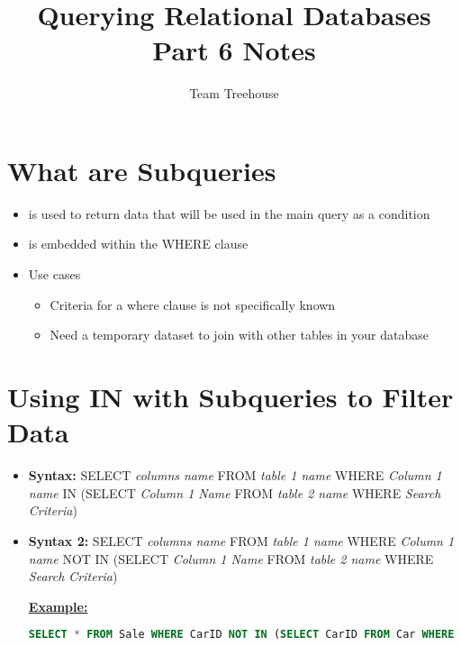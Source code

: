 \documentclass[12pt]{article}
\begin{document}
\title{Querying Relational Databases Part 6 Notes}
\author{Team Treehouse}
\maketitle

\bigskip

\section{What are Subqueries}

\bigskip

\begin{itemize}
    \item is used to return data that will be used in the main query as a condition
    \item is embedded within the WHERE clause
    \item Use cases
    \begin{itemize}
        \item Criteria for a where clause is not specifically known
        \item Need a temporary dataset to join with other tables in your database
    \end{itemize}
\end{itemize}

\bigskip

\section{Using IN with Subqueries to Filter Data}

\bigskip

\begin{itemize}
    \item \textbf{Syntax:} SELECT \textit{columns name} FROM \textit{table 1 name}
    WHERE \textit{Column 1 name} IN (SELECT \textit{Column 1 Name} FROM \textit{table 2 name}
    WHERE \textit{Search Criteria})

    \item \textbf{Syntax 2:} SELECT \textit{columns name} FROM \textit{table 1 name}
    WHERE \textit{Column 1 name} NOT IN (SELECT \textit{Column 1 Name} FROM \textit{table 2 name}
    WHERE \textit{Search Criteria})

    \bigskip

    \underline{\textbf{Example:}}

    \bigskip

    \begin{lstlisting}[language=SQL]
    SELECT * FROM Sale WHERE CarID NOT IN (SELECT CarID FROM Car WHERE ModelYear = 2015);
    \end{lstlisting}
\end{itemize}
\end{document}
